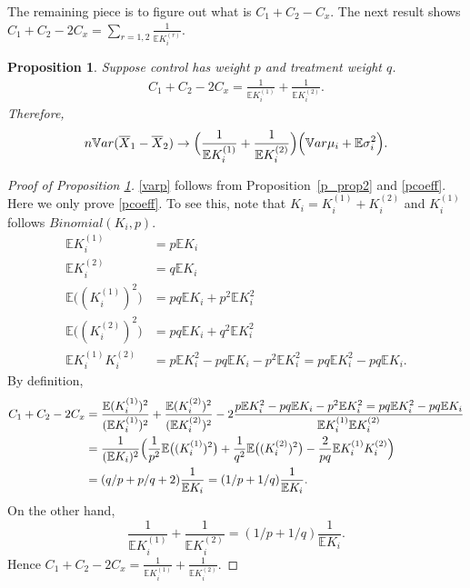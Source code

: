 \documentclass[11pt]{asaproc}
\newcommand{\var}{\ensuremath{\mathbb Var}}
\newcommand{\bbe}{\mathbb{E}}
\newcommand{\xbar}{\overline{X}}
\newtheorem{prop}[thm]{Proposition}
\begin{document}
The remaining piece is to figure out what is $C_1+C_2-C_x$.  The next result shows $C_1+C_2- 2C_x = \sum_{r=1,2} \frac{1}{\bbe K_i^{(r)}}$. 
\begin{prop}\label{p_prop3}
Suppose control has weight $p$ and treatment weight $q$. 
\begin{align}\label{pcoeff}
C_1+C_2-2C_x = \frac{1 }{\bbe K_i^{(1)}}+\frac{1}{\bbe K_i^{(2)}}.
\end{align}
Therefore, 
\begin{align}\label{varp}
n\var(\xbar_1-\xbar_2) \to \Bigl(\frac{1 }{\bbe K_i^{(1)}}+\frac{1}{\bbe K_i^{(2)}}\Bigr) \Bigl( \var \mu_i + \bbe \sigma_i^2\Bigr).
\end{align}
\end{prop}

\begin{proof}[Proof of Proposition \ref{p_prop3}]
\eqref{varp} follows from Proposition~\ref{p_prop2} and \eqref{pcoeff}. Here we only prove \eqref{pcoeff}. To see this, note that $K_i = K_i^{(1)}+K_i^{(2)}$ and $K_i^{(1)}$ follows $Binomial(K_i, p)$. 
\begin{align*}
\bbe K_i^{(1)} &= p\bbe K_i\\
\bbe K_i^{(2)} &=q\bbe K_i\\
\bbe \bigl((K_i^{(1)})^2\bigr)& = pq \bbe K_i + p^2 \bbe K_i^2\\
\bbe \bigl((K_i^{(2)})^2\bigr)& = pq \bbe K_i + q^2 \bbe K_i^2\\
\bbe K_i^{(1)}K_i^{(2)}& = p \bbe K_i^2 - pq \bbe K_i - p^2 \bbe K_i^2 = pq \bbe K_i^2 -pq \bbe K_i.
\end{align*}
By definition, 
\begin{align*}
C_1+C_2-2C_x &= \frac{\bbe (K_i^{(1)})^2}{(\bbe K_i^{(1)})^2} + \frac{\bbe (K_i^{(2)})^2}{(\bbe K_i^{(2)})^2} - 2 \frac{ p \bbe K_i^2 - pq \bbe K_i - p^2 \bbe K_i^2 = pq \bbe K_i^2 -pq \bbe K_i}{\bbe K_i^{(1)}\bbe K_i^{(2)}}\\
&= \frac{1}{(\bbe K_i)^2}\Bigl(\frac{1}{p^2 }\bbe \bigl((K_i^{(1)})^2\bigr)+\frac{1}{q^2}\bbe \bigl((K_i^{(2)})^2\bigr) - \frac{2}{pq}\bbe K_i^{(1)}K_i^{(2)} \Bigr)\\
& = (q/p + p/q +2) \frac{1}{\bbe K_i} = (1/p+1/q)\frac{1}{\bbe K_i}.
\end{align*}
On the other hand,
\[
\frac{1 }{\bbe K_i^{(1)}}+\frac{1}{\bbe K_i^{(2)}} = (1/p+1/q)\frac{1}{\bbe K_i}. 
\]
Hence $C_1+C_2-2C_x = \frac{1 }{\bbe K_i^{(1)}}+\frac{1}{\bbe K_i^{(2)}}$. 
\end{proof}
\end{document}
